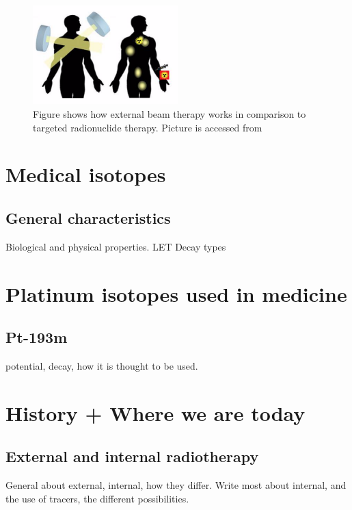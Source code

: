 \documentclass[a4paper,11pt,twoside]{book}
\begin{document}
\begin{figure}
    \centering
    \includegraphics[width=0.5\textwidth]{Theory/internal_vs_external.png}
    \caption{Figure shows how external beam therapy works in comparison to targeted radionuclide therapy. Picture is accessed from \cite{figure_internal_external}}
    \label{fig:interna_external}
\end{figure}


\section{Medical isotopes}

\subsection{General characteristics}
Biological and physical properties. 
LET
Decay types 





\section{Platinum isotopes used in medicine} 

\subsection{Pt-193m}
potential, decay, how it is thought to be used. 

\section{History + Where we are today}

\subsection{External and internal radiotherapy }
General about external, internal, how they differ. Write most about internal, and the use of tracers, the different possibilities. 
\end{document}
